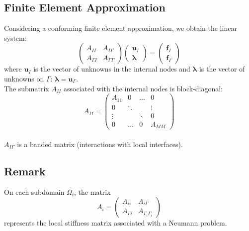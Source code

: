 \documentclass[11pt]{book}
\begin{document}
\subsection*{Finite Element Approximation}
Considering a conforming finite element approximation, we obtain the linear system:
\begin{equation}
\left(
\begin{array}{cc}
A_{II} & A_{I\Gamma} \\
A_{\Gamma I} & A_{\Gamma \Gamma}
\end{array}
\right)
\left(
\begin{array}{c}
\mathbf{u}_{I} \\
\boldsymbol{\lambda}
\end{array}
\right) =
\left(
\begin{array}{c}
\mathbf{f}_{I} \\
\mathbf{f}_{\Gamma}
\end{array}
\right)
\end{equation}
where $\mathbf{u}_{I}$ is the vector of unknowns in the internal nodes and $\boldsymbol{\lambda}$ is the vector of unknowns on $\Gamma$: $\boldsymbol{\lambda} = \mathbf{u}_{\Gamma}$.\\
The submatrix $A_{II}$ associated with the internal nodes is block-diagonal:
\begin{equation}
A_{II} = 
\left(
\begin{array}{cccc}
A_{11} & 0 & \ldots & 0 \\
0 & \ddots & & \vdots \\
\vdots & & \ddots & 0 \\
0 & \ldots & 0 & A_{MM}
\end{array}
\right)
\end{equation}\\
$A_{I\Gamma}$ is a banded matrix (interactions with local interfaces).

\subsection*{Remark}
On each subdomain $\Omega_{i}$, the matrix
\begin{equation}
A_{i} = 
\left(
\begin{array}{cc}
A_{ii} & A_{i\Gamma} \\
A_{\Gamma i} & A_{\Gamma_{i}\Gamma_{i}}
\end{array}
\right)
\end{equation}
represents the local stiffness matrix associated with a Neumann problem.
\end{document}
